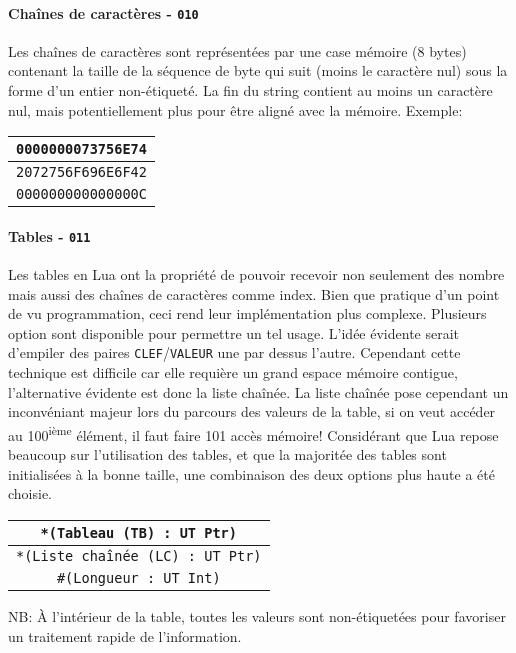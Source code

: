 \documentclass{article}
\begin{document}
\paragraph{Chaînes de caractères - \texttt{010}}
Les chaînes de caractères sont représentées par une case mémoire (8 bytes) contenant la taille de la séquence de byte qui suit (moins le caractère nul) sous la forme d'un entier non-étiqueté. La fin du string contient au moins un caractère nul, mais potentiellement plus pour être aligné avec la mémoire. Exemple:
\begin{center}
  \begin{tabular}{|c|}
    \hline
    \texttt{0000000073756E74}\\
    \hline
    \texttt{2072756F696E6F42}\\
    \hline
    \texttt{000000000000000C}\\
    \hline
  \end{tabular}
\end{center}
\paragraph{Tables - \texttt{011}}
Les tables en Lua ont la propriété de pouvoir recevoir non seulement des nombre mais aussi des chaînes de caractères comme index. Bien que pratique d'un point de vu programmation, ceci rend leur implémentation plus complexe. Plusieurs option sont disponible pour permettre un tel usage. L'idée évidente serait d'empiler des paires \texttt{CLEF}/\texttt{VALEUR} une par dessus l'autre. Cependant cette technique est difficile car elle requière un grand espace mémoire contigue, l'alternative évidente est donc la liste chaînée. La liste chaînée pose cependant un inconvéniant majeur lors du parcours des valeurs de la table, si on veut accéder au 100\textsuperscript{ième} élément, il faut faire 101 accès mémoire! Considérant que Lua repose beaucoup sur l'utilisation des tables, et que la majoritée des tables sont initialisées à la bonne taille, une combinaison des deux options plus haute a été choisie.
\begin{center}
  \begin{tabular}{|c|}
    \hline
    \texttt{*(Tableau (TB) : UT Ptr)}\\
    \hline
    \texttt{*(Liste chaînée (LC) : UT Ptr)}\\
    \hline
    \texttt{\#{}(Longueur : UT Int)}\\
    \hline
  \end{tabular}
\end{center}
NB: À l'intérieur de la table, toutes les valeurs sont non-étiquetées pour favoriser un traitement rapide de l'information.
\end{document}
